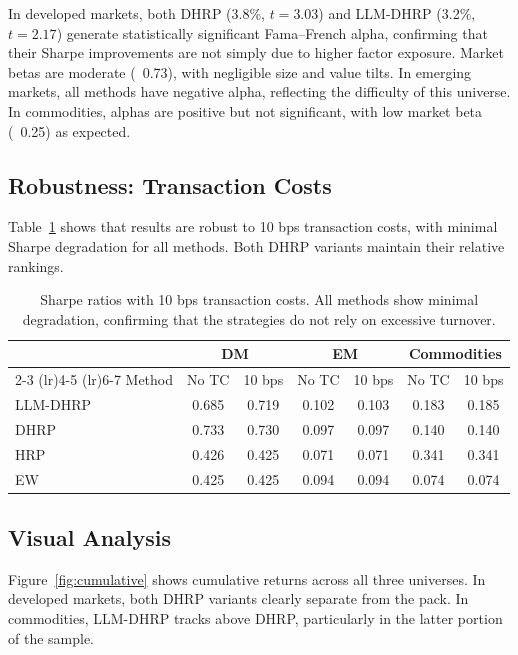 \documentclass[11pt]{article}
\begin{document}
In developed markets, both DHRP (3.8\%, $t = 3.03$) and LLM-DHRP (3.2\%, $t = 2.17$) generate statistically significant Fama--French alpha, confirming that their Sharpe improvements are not simply due to higher factor exposure. Market betas are moderate (~0.73), with negligible size and value tilts. In emerging markets, all methods have negative alpha, reflecting the difficulty of this universe. In commodities, alphas are positive but not significant, with low market beta (~0.25) as expected.

\subsection{Robustness: Transaction Costs}

Table~\ref{tab:tc} shows that results are robust to 10 bps transaction costs, with minimal Sharpe degradation for all methods. Both DHRP variants maintain their relative rankings.

\begin{table}[t]
\centering
\caption{Sharpe ratios with 10 bps transaction costs. All methods show minimal degradation, confirming that the strategies do not rely on excessive turnover.}
\label{tab:tc}
\small
\begin{tabular}{lcccccc}
\toprule
& \multicolumn{2}{c}{DM} & \multicolumn{2}{c}{EM} & \multicolumn{2}{c}{Commodities} \\
\cmidrule(lr){2-3} \cmidrule(lr){4-5} \cmidrule(lr){6-7}
Method & No TC & 10 bps & No TC & 10 bps & No TC & 10 bps \\
\midrule
LLM-DHRP & 0.685 & 0.719 & 0.102 & 0.103 & 0.183 & 0.185 \\
DHRP & 0.733 & 0.730 & 0.097 & 0.097 & 0.140 & 0.140 \\
HRP & 0.426 & 0.425 & 0.071 & 0.071 & 0.341 & 0.341 \\
EW & 0.425 & 0.425 & 0.094 & 0.094 & 0.074 & 0.074 \\
\bottomrule
\end{tabular}
\end{table}

\subsection{Visual Analysis}

Figure~\ref{fig:cumulative} shows cumulative returns across all three universes. In developed markets, both DHRP variants clearly separate from the pack. In commodities, LLM-DHRP tracks above DHRP, particularly in the latter portion of the sample.
\end{document}
